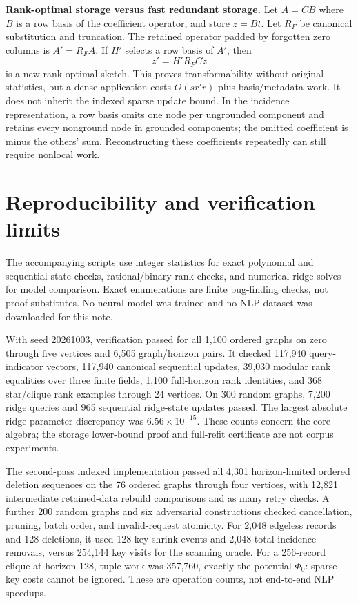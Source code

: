 \documentclass[11pt,a4paper]{article}
\theoremstyle{definition}\newtheorem{definition}[theorem]{Definition}
\begin{document}
\textbf{Rank-optimal storage versus fast redundant storage.} Let $A=CB$ where $B$ is a row basis of the coefficient operator, and store $z=Bt$. Let $R_F$ be canonical substitution and truncation. The retained operator padded by forgotten zero columns is $A'=R_FA$. If $H'$ selects a row basis of $A'$, then
\[
 z'=H'R_FCz
\]
is a new rank-optimal sketch. This proves transformability without original statistics, but a dense application costs $O(sr'r)$ plus basis/metadata work. It does not inherit the indexed sparse update bound. In the incidence representation, a row basis omits one node per ungrounded component and retains every nonground node in grounded components; the omitted coefficient is minus the others' sum. Reconstructing these coefficients repeatedly can still require nonlocal work.

\section{Reproducibility and verification limits}
The accompanying scripts use integer statistics for exact polynomial and sequential-state checks, rational/binary rank checks, and numerical ridge solves for model comparison. Exact enumerations are finite bug-finding checks, not proof substitutes. No neural model was trained and no NLP dataset was downloaded for this note.

With seed 20261003, verification passed for all 1,100 ordered graphs on zero through five vertices and 6,505 graph/horizon pairs. It checked 117,940 query-indicator vectors, 117,940 canonical sequential updates, 39,030 modular rank equalities over three finite fields, 1,100 full-horizon rank identities, and 368 star/clique rank examples through 24 vertices. On 300 random graphs, 7,200 ridge queries and 965 sequential ridge-state updates passed. The largest absolute ridge-parameter discrepancy was $6.56\times10^{-15}$. These counts concern the core algebra; the storage lower-bound proof and full-refit certificate are not corpus experiments.

The second-pass indexed implementation passed all 4,301 horizon-limited ordered deletion sequences on the 76 ordered graphs through four vertices, with 12,821 intermediate retained-data rebuild comparisons and as many retry checks. A further 200 random graphs and six adversarial constructions checked cancellation, pruning, batch order, and invalid-request atomicity. For 2,048 edgeless records and 128 deletions, it used 128 key-shrink events and 2,048 total incidence removals, versus 254,144 key visits for the scanning oracle. For a 256-record clique at horizon 128, tuple work was 357,760, exactly the potential $\Phi_0$: sparse-key costs cannot be ignored. These are operation counts, not end-to-end NLP speedups.
\end{document}
